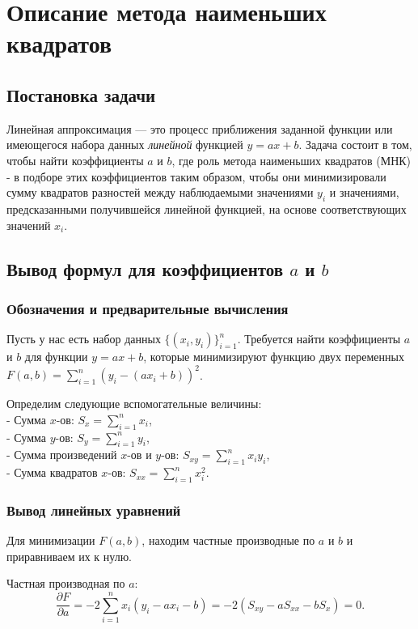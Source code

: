 \section{Описание метода наименьших квадратов}

\subsection{Постановка задачи}
Линейная аппроксимация — это процесс приближения заданной функции или имеющегося набора данных \emph{линейной} функцией $y = ax + b$. Задача состоит в том, чтобы найти коэффициенты $a$ и $b$, где роль метода наименьших квадратов (МНК) - в подборе этих коэффициентов таким образом, чтобы они минимизировали сумму квадратов разностей между наблюдаемыми значениями $y_i$ и значениями, предсказанными получившейся линейной функцией, на основе соответствующих значений $x_i$.

\subsection{Вывод формул для коэффициентов $a$ и $b$}
\subsubsection{Обозначения и предварительные вычисления}
Пусть у нас есть набор данных $\{(x_i, y_i)\}_{i=1}^n$. Требуется найти коэффициенты $a$ и $b$ для функции $y = ax + b$, которые минимизируют функцию двух переменных $F(a, b) = \sum_{i=1}^{n}(y_i - (ax_i + b))^2$.
\vspace{1mm}

Определим следующие вспомогательные величины: \\
- Сумма $x$-ов: $S_x = \sum_{i=1}^{n} x_i$, \\
- Сумма $y$-ов: $S_y = \sum_{i=1}^{n} y_i$, \\
- Сумма произведений $x$-ов и $y$-ов: $S_{xy} = \sum_{i=1}^{n} x_i y_i$, \\
- Сумма квадратов $x$-ов: $S_{xx} = \sum_{i=1}^{n} x_i^2$.

\subsubsection{Вывод линейных уравнений}
Для минимизации $F(a, b)$, находим частные производные по $a$ и $b$ и приравниваем их к нулю.

Частная производная по $a$:
\[
\frac{\partial F}{\partial a} = -2 \sum_{i=1}^{n} x_i(y_i - ax_i - b) = -2(S_{xy} - aS_{xx} - bS_x) = 0.
\]

